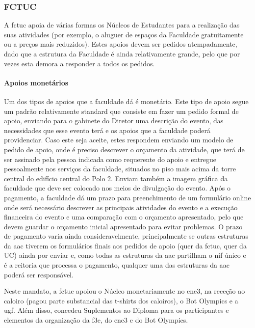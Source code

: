 
\subsubsection{FCTUC}

A \acrfull{fctuc} apoia de várias formas os Núcleos de Estudantes para a realização das suas atividades (por exemplo, o aluguer de espaços da Faculdade gratuitamente ou a preços mais reduzidos). Estes apoios devem ser pedidos atempadamente, dado que a estrutura da Faculdade é ainda relativamente grande, pelo que por vezes esta demora a responder a todos os pedidos.

\paragraph{Apoios monetários}
Um dos tipos de apoios que a faculdade dá é monetário. Este tipo de apoio segue um padrão relativamente standard que consiste em fazer um pedido formal de apoio, enviando para o gabinete do Diretor uma descrição do evento, das necessidades que esse evento terá e os apoios que a faculdade poderá providenciar. Caso este seja aceite, estes respondem enviando um modelo de pedido de apoio, onde é preciso descrever o orçamento da atividade, que terá de ser assinado pela pessoa indicada como requerente do apoio e entregue pessoalmente nos serviços da faculdade, situados no piso mais acima da torre central do edifício central do Polo 2. Enviam também a imagem gráfica da faculdade que deve ser colocado nos meios de divulgação do evento. Após o pagamento, a faculdade dá um prazo para preenchimento de um formulário online onde será necessário descrever as principais atividades do evento e a execução financeira do evento e uma comparação com o orçamento apresentado, pelo que devem guardar o orçamento inicial apresentado para evitar problemas. O prazo de pagamento varia ainda consideravelmente, principalmente se outras estruturas da \acrshort{aac} tiverem os formulários finais aos pedidos de apoio (quer da \acrshort{fctuc}, quer da UC) ainda por enviar e, como todas as estruturas da \acrshort{aac} partilham o \acrshort{nif} único e é a reitoria que processa o pagamento, qualquer uma das estruturas da \acrshort{aac} poderá ser responsável.

Neste mandato, a \acrshort{fctuc} apoiou o Núcleo monetariamente no \acrshort{ene3}, na receção ao caloiro (pagou parte substancial das t-shirts dos caloiros), o Bot Olympics e a \acrshort{ugf}. Além disso, concedeu Suplementos ao Diploma para os participantes e elementos da organização da \acrshort{f3e}, do \acrshort{ene3} e do Bot Olympics.


